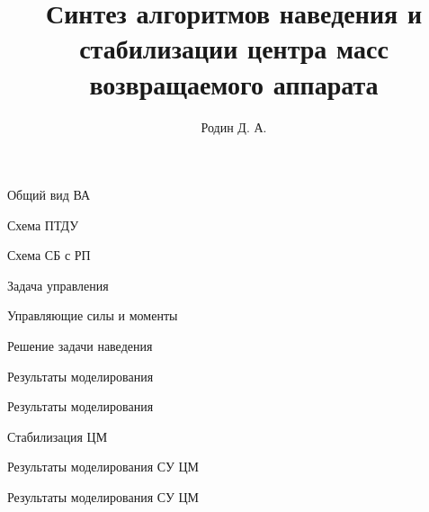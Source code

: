 \documentclass{beamer}
\title[Синтез алгоритмов]{Синтез алгоритмов наведения и стабилизации центра масс возвращаемого аппарата}
\institute[МГТУ] %
{
	МГТУ им. Н.Э. Баумана \\
	
}
\author{Родин Д. А.}
\begin{document}
\begin{frame}[plain]
    \maketitle
\end{frame}

\begin{frame}{Общий вид ВА}
\end{frame}

\begin{frame}{Схема ПТДУ}
\end{frame}

\begin{frame}{Схема СБ с РП}
\end{frame}

\begin{frame}{Задача управления}
\end{frame}

\begin{frame}{Управляющие силы и моменты}
\end{frame}

\begin{frame}{Решение задачи наведения}
\end{frame}

\begin{frame}{Результаты моделирования}
\end{frame}
\begin{frame}{Результаты моделирования}
\end{frame}

\begin{frame}{Стабилизация ЦМ}
\end{frame}

\begin{frame}{Результаты моделирования СУ ЦМ}
\end{frame}

\begin{frame}{Результаты моделирования СУ ЦМ}
\end{frame}
\end{document}
